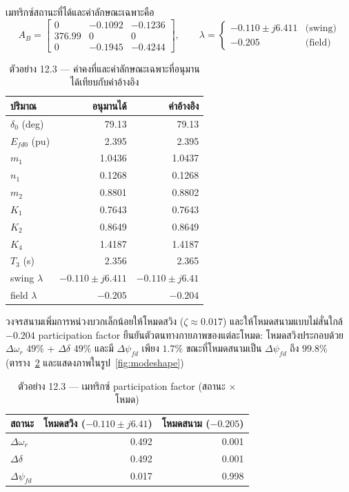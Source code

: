 \documentclass[12pt,a4paper]{article}
\newcommand{\dwr}{\Delta\omega_r}
\newcommand{\ddel}{\Delta\delta}
\newcommand{\dpsifd}{\Delta\psi_{fd}}
\begin{document}
เมทริกซ์สถานะที่ได้และค่าลักษณะเฉพาะคือ
\begin{equation}
A_B =
\begin{bmatrix}
0 & -0.1092 & -0.1236 \\
376.99 & 0 & 0 \\
0 & -0.1945 & -0.4244
\end{bmatrix},
\qquad
\lambda =
\begin{cases}
-0.110 \pm j6.411 & \text{(swing)} \\
-0.205 & \text{(field)}
\end{cases}
\end{equation}

\begin{table}[H]
\centering
\caption{ตัวอย่าง 12.3 --- ค่าคงที่และค่าลักษณะเฉพาะที่อนุมานได้เทียบกับค่าอ้างอิง}
\label{tab:kderivtab}
\begin{tabular}{@{}lrr@{}}
\toprule
ปริมาณ & อนุมานได้ & ค่าอ้างอิง \\
\midrule
$\delta_0$ (deg) & 79.13 & 79.13 \\
$E_{fd0}$ (pu)   & 2.395 & 2.395 \\
$m_1$ & 1.0436 & 1.0437 \\
$n_1$ & 0.1268 & 0.1268 \\
$m_2$ & 0.8801 & 0.8802 \\
$K_1$            & 0.7643 & 0.7643 \\
$K_2$            & 0.8649 & 0.8649 \\
$K_4$            & 1.4187 & 1.4187 \\
$T_3$ (s)        & 2.356 & 2.365 \\
swing $\lambda$  & $-0.110\pm j6.411$ & $-0.110\pm j6.41$ \\
field $\lambda$  & $-0.205$ & $-0.204$ \\
\bottomrule
\end{tabular}
\end{table}

วงจรสนามเพิ่มการหน่วงบวกเล็กน้อยให้โหมดสวิง ($\zeta\approx0.017$)
และให้โหมดสนามแบบไม่สั่นใกล้ $-0.204$
participation factor ยืนยันตัวตนทางกายภาพของแต่ละโหมด:
โหมดสวิงประกอบด้วย $\dwr$ $49\%$ + $\ddel$ $49\%$ และมี $\dpsifd$ เพียง $1.7\%$
ขณะที่โหมดสนามเป็น $\dpsifd$ ถึง $99.8\%$ (ตาราง~\ref{tab:partic}
และแสดงภาพในรูป~\ref{fig:modeshape})

\begin{table}[H]
\centering
\caption{ตัวอย่าง 12.3 --- เมทริกซ์ participation factor (สถานะ $\times$ โหมด)}
\label{tab:partic}
\begin{tabular}{@{}lrr@{}}
\toprule
สถานะ & โหมดสวิง ($-0.110\pm j6.41$) & โหมดสนาม ($-0.205$) \\
\midrule
$\dwr$    & 0.492 & 0.001 \\
$\ddel$   & 0.492 & 0.001 \\
$\dpsifd$ & 0.017 & 0.998 \\
\bottomrule
\end{tabular}
\end{table}
\end{document}
